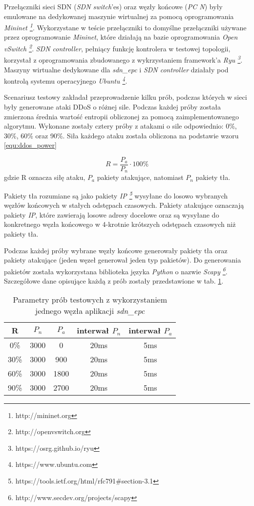 Przełączniki sieci SDN (\textit{SDN switch}'es) oraz węzły końcowe (\textit{PC
  N}) były emulowane na dedykowanej maszynie wirtualnej za pomocą oprogramowania
\textit{Mininet \footnote{http://mininet.org}}. Wykorzystane w teście
przełączniki to domyślne przełączniki używane przez oprogramowanie
\textit{Mininet}, które działają na bazie oprogramowania
\textit{Open vSwitch \footnote{http://openvswitch.org}}.
\textit{SDN controller}, pełniący funkcję kontrolera w testowej topologii,
korzystał z oprogramowania zbudowanego z wykrzystaniem framework'a
\textit{Ryu \footnote{https://osrg.github.io/ryu}}. Maszyny wirtualne dedykowane
dla \textit{sdn\_epc} i \textit{SDN controller} działały pod kontrolą systemu
operacyjnego \textit{Ubuntu \footnote{https://www.ubuntu.com}}.

Scenariusz testowy zakładał przeprowadzenie kilku prób, podczas których w sieci
były generowane ataki DDoS o różnej sile. Podczas każdej próby została zmierzona
średnia wartość entropii obliczonej za pomocą zaimplementowanego algorytmu.
Wykonane zostały cztery próby z atakami o sile odpowiednio: 0\%, 30\%, 60\% oraz
90\%. Siła każdego ataku została obliczona na podstawie wzoru
\ref{equ:ddos_power}

\begin{equation}
R = \frac{P_{a}}{P_{n}} \cdot 100\%
\label{equ:ddos_power}
\end{equation}
gdzie R oznacza siłę ataku, $P_{a}$ pakiety atakujące, natomiast $P_{n}$ pakiety
tła.

Pakiety tła rozumiane są jako pakiety
\textit{IP \footnote{https://tools.ietf.org/html/rfc791\#section-3.1}} wysyłane
do losowo wybranych węzłów końcowych w stałych odstępach czasowych. Pakiety
atakujące oznaczają pakiety \textit{IP}, które zawierają losowe adresy docelowe
oraz są wysyłane do konkretnego węzła końcowego w 4-krotnie krótszych odstępach
czasowych niż pakiety tła. 

Podczas każdej próby wybrane węzły końcowe generowały pakiety tła oraz
pakiety atakujące (jeden węzeł generował jeden typ pakietów). Do generowania
pakietów została wykorzystana biblioteka języka \textit{Python} o nazwie
\textit{ Scapy \footnote{http://www.secdev.org/projects/scapy}}. Szczegółowe
dane opisujące każdą z prób zostały przedstawione w tab. \ref{tab:entropy}.
\newpage

\begin{table}[h!]
\centering
\begin{tabular}{ |c|c|c|c|c| } 
 \hline
 R & $P_{n}$ & $P_{a}$ & interwał $P_{n}$ & interwał $P_{a}$ \\
 \hline
 0\% & 3000 & 0 & 20ms & 5ms \\ 
 \hline
 30\% & 3000 & 900 & 20ms & 5ms \\ 
 \hline
 60\% & 3000 & 1800 & 20ms & 5ms \\ 
 \hline
 90\% & 3000 & 2700 & 20ms & 5ms \\ 
 \hline
\end{tabular}
\caption{Parametry prób testowych z wykorzystaniem jednego węzła aplikacji
  \textit{sdn\_epc}} 
\label{tab:entropy}
\end{table}

